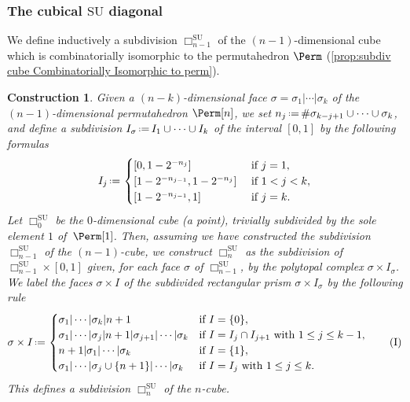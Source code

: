 \documentclass{amsart}
\newtheorem{construction}[theorem]{Construction}
\theoremstyle{definition}
\newcommand{\eqdef}{\mbox{\,\raisebox{0.2ex}{\scriptsize\ensuremath{\mathrm:}}\ensuremath{=}\,}} %
\newcommand{\card}[1]{\##1} %
\newcommand{\SU}{\mathrm{SU}}
\newcommand{\divcube}[1]{\Box_{#1}}
\begin{document}
\subsubsection{The cubical $\SU$ diagonal}

We define inductively a subdivision $\divcube{n-1}^\SU$ of the $(n-1)$-dimensional cube which is combinatorially isomorphic to the permutahedron $\Perm$ (\cref{prop:subdiv cube Combinatorially Isomorphic to perm}).

\begin{construction}
\label{constr:cubicPermutahedron1}
Given a $(n-k)$-dimensional face $\sigma = \sigma_1| \cdots |\sigma_k$ of the $(n-1)$-dimensional permutahedron $\Perm[n]$, we set $n_j \eqdef \card{\sigma_{k-j+1}\cup\dots\cup \sigma_k}$, and define a subdivision $I_\sigma \eqdef I_1 \cup \dots \cup I_k$ of the interval $[0,1]$ by the following formulas
\begin{equation*}
	I_j \eqdef
	\begin{cases}
		\left[0,1 - 2^{-n_j}\right] & \text{ if } j=1, \\
		\left[1 - 2^{-n_{j-1}}, 1 - 2^{-n_{j}}\right]  & \text{ if } 1 < j < k, \\
		\left[1 - 2^{-n_{j-1}},1\right] & \text{ if } j=k .
	\end{cases}
\end{equation*}
Let $\divcube{0}^\SU$ be the $0$-dimensional cube (a point), trivially subdivided by the sole element $1$ of~$\Perm[1]$.
Then, assuming we have constructed the subdivision $\divcube{n-1}^\SU$ of the $(n-1)$-cube, we construct $\divcube{n}^\SU$ as the subdivision of $\divcube{n-1}^\SU \times [0,1]$ given, for each face $\sigma$ of $\divcube{n-1}^\SU$, by the polytopal complex $\sigma \times I_\sigma$. 
We label the faces $\sigma \times I$ of the subdivided rectangular prism $\sigma \times I_\sigma$ by the following rule
\begin{align} \label{eq:sub}
	\sigma \times I \eqdef
	\begin{cases}
		\sigma_1| \cdots |\sigma_k| n+1 & \text{if } I = \{0\}, \\
		\sigma_1| \cdots |\sigma_j| n+1 |\sigma_{j+1}| \cdots |\sigma_k & \text{if } I = I_j \cap I_{j+1} \text{ with } 1 \leq j \leq k-1 , \\
		n+1|\sigma_1| \cdots |\sigma_k  & \text{if } I = \{1\}, \\
		\sigma_1| \cdots |\sigma_j \cup \{n+1\}| \cdots |\sigma_k & \text{if } I = I_j \text{ with }  1\leq j \leq k.
	\end{cases} 
	\tag{I}
\end{align}
This defines a subdivision $\divcube{n}^\SU$ of the $n$-cube.
\end{construction}
\end{document}
